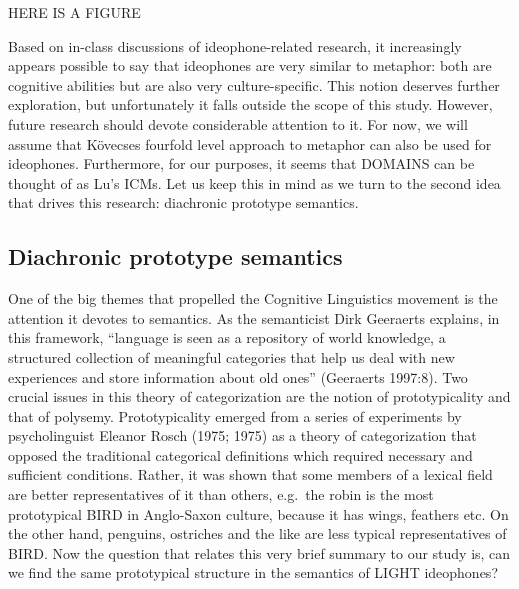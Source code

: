 HERE IS A FIGURE

Based on in-class discussions of ideophone-related research, it
increasingly appears possible to say that ideophones are very similar to
metaphor: both are cognitive abilities but are also very
culture-specific. This notion deserves further exploration, but
unfortunately it falls outside the scope of this study. However, future
research should devote considerable attention to it. For now, we will
assume that Kövecses fourfold level approach to metaphor can also be
used for ideophones. Furthermore, for our purposes, it seems that
DOMAINS can be thought of as Lu's ICMs. Let us keep this in mind as we
turn to the second idea that drives this research: diachronic prototype
semantics.

\subsection{Diachronic prototype
semantics}\label{diachronic-prototype-semantics}

One of the big themes that propelled the Cognitive Linguistics movement
is the attention it devotes to semantics. As the semanticist Dirk
Geeraerts explains, in this framework, ``language is seen as a
repository of world knowledge, a structured collection of meaningful
categories that help us deal with new experiences and store information
about old ones'' (Geeraerts 1997:8). Two crucial issues in this theory
of categorization are the notion of prototypicality and that of
polysemy. Prototypicality emerged from a series of experiments by
psycholinguist Eleanor Rosch (1975; 1975) as a theory of categorization
that opposed the traditional categorical definitions which required
necessary and sufficient conditions. Rather, it was shown that some
members of a lexical field are better representatives of it than others,
e.g.~the robin is the most prototypical BIRD in Anglo-Saxon culture,
because it has wings, feathers etc. On the other hand, penguins,
ostriches and the like are less typical representatives of BIRD. Now the
question that relates this very brief summary to our study is, can we
find the same prototypical structure in the semantics of LIGHT
ideophones?

